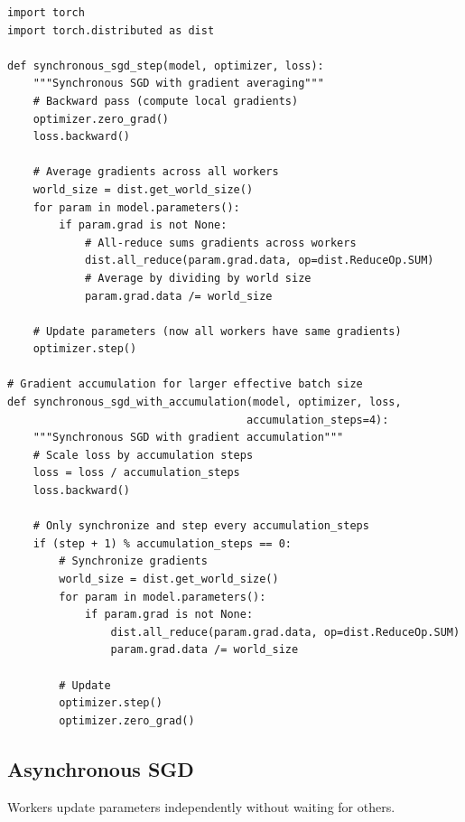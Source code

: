 \begin{lstlisting}[style=python, caption=Synchronous gradient synchronization]
import torch
import torch.distributed as dist

def synchronous_sgd_step(model, optimizer, loss):
    """Synchronous SGD with gradient averaging"""
    # Backward pass (compute local gradients)
    optimizer.zero_grad()
    loss.backward()

    # Average gradients across all workers
    world_size = dist.get_world_size()
    for param in model.parameters():
        if param.grad is not None:
            # All-reduce sums gradients across workers
            dist.all_reduce(param.grad.data, op=dist.ReduceOp.SUM)
            # Average by dividing by world size
            param.grad.data /= world_size

    # Update parameters (now all workers have same gradients)
    optimizer.step()

# Gradient accumulation for larger effective batch size
def synchronous_sgd_with_accumulation(model, optimizer, loss,
                                     accumulation_steps=4):
    """Synchronous SGD with gradient accumulation"""
    # Scale loss by accumulation steps
    loss = loss / accumulation_steps
    loss.backward()

    # Only synchronize and step every accumulation_steps
    if (step + 1) % accumulation_steps == 0:
        # Synchronize gradients
        world_size = dist.get_world_size()
        for param in model.parameters():
            if param.grad is not None:
                dist.all_reduce(param.grad.data, op=dist.ReduceOp.SUM)
                param.grad.data /= world_size

        # Update
        optimizer.step()
        optimizer.zero_grad()
\end{lstlisting}

\subsection{Asynchronous SGD}

Workers update parameters independently without waiting for others.

